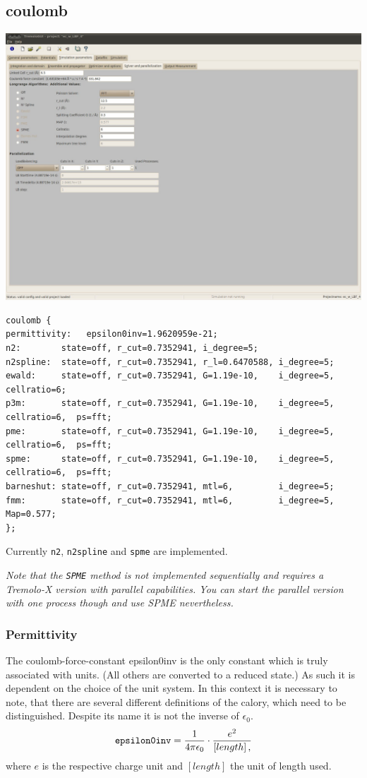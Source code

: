 \subsection{coulomb}
\label{sub:coulomb}
\includegraphics[width=15cm]{visuals/GUI_Parameter_LongRange_Parallel.jpg}
\begin{lstlisting}
coulomb {
permittivity:   epsilon0inv=1.9620959e-21; 
n2:        state=off, r_cut=0.7352941, i_degree=5;
n2spline:  state=off, r_cut=0.7352941, r_l=0.6470588, i_degree=5;
ewald:     state=off, r_cut=0.7352941, G=1.19e-10,    i_degree=5,  cellratio=6;
p3m:       state=off, r_cut=0.7352941, G=1.19e-10,    i_degree=5,  cellratio=6,  ps=fft;
pme:       state=off, r_cut=0.7352941, G=1.19e-10,    i_degree=5,  cellratio=6,  ps=fft;
spme:      state=off, r_cut=0.7352941, G=1.19e-10,    i_degree=5,  cellratio=6,  ps=fft;
barneshut: state=off, r_cut=0.7352941, mtl=6,         i_degree=5;
fmm:       state=off, r_cut=0.7352941, mtl=6,         i_degree=5,  Map=0.577;
};
\end{lstlisting}

Currently \texttt{n2}, \texttt{n2spline} and \texttt{spme} are implemented.

\emph{Note that the \texttt{SPME} method
is not implemented sequentially and requires a Tremolo-X version with parallel capabilities. 
You can start the parallel version with one process though and use SPME nevertheless.}
\subsubsection{Permittivity}
The coulomb-force-constant epsilon0inv is the only constant which is truly associated with units.
(All others are converted to a reduced state.) As such it is dependent on the choice of the unit system. 
In this context it is necessary to note, that there are several different definitions of the calory,
which need to be distinguished.
Despite its name it is not the inverse of $\epsilon_0$.
\begin{equation*}
\text{\tt epsilon0inv}=\frac{1}{4 \pi \epsilon_0} \cdot \frac{e^2}{\left[length\right],}
\end{equation*}
where $e$ is the respective charge unit and $\left[length\right]$ the unit of length used.


